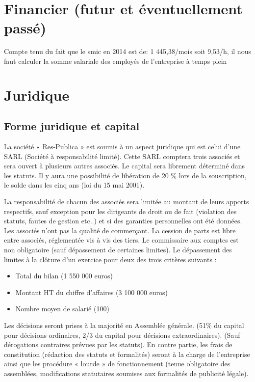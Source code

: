\documentclass[11pt]{article}
\begin{document}

\section{Financier (futur et éventuellement passé)}
\label{sec:financier}
Compte tenu du fait que le smic en 2014 est de: 1 445,38/mois soit 9,53/h, il nous faut calculer la somme salariale des employés de l'entreprise à temps plein

\section{Juridique}
\label{sec:juridique}
\subsection{Forme juridique et capital}
\label{sub:juridique_capital}

La société « Res-Publica » est soumis à un aspect juridique qui est celui d'une SARL (Société à responsabilité limité). Cette SARL comptera trois associés et sera ouvert à plusieurs autres associés. Le capital sera librement déterminé dans les statuts. Il y aura une possibilité de libération de 20 \% lors de la souscription, le solde dans les cinq ans (loi du 15 mai 2001).

La responsabilité de chacun des associés sera limitée au montant de leurs apports respectifs, sauf exception pour les dirigeants de droit ou de fait (violation des statuts, fautes de gestion etc..) et si des garanties personnelles ont été données.
Les associés n'ont pas la qualité de commerçant.
La cession de parts est libre entre associés, réglementée vis à vis des tiers.
Le commissaire aux comptes est non obligatoire (sauf dépassement de certaines limites). Le dépassement des limites à la clôture d'un exercice pour deux des trois critères suivants :
\begin{itemize}
	\item Total du bilan (1 550 000 euros) 
	\item Montant HT du chiffre d'affaires (3 100 000 euros)
	\item Nombre moyen de salarié (100)
\end{itemize}

Les décisions seront prises à la majorité en Assemblée générale. (51\% du capital pour décisions ordinaires, 2/3 du capital pour décisions extraordinaires). (Sauf dérogations contraires prévues par les statuts). En contre partie, les frais de constitution (rédaction des statuts et formalités) seront à la charge de l'entreprise ainsi que les procédure « lourde » de fonctionnement (tenue obligatoire des assemblées, modifications statutaires soumises aux formalités de publicité légale).
\end{document}
